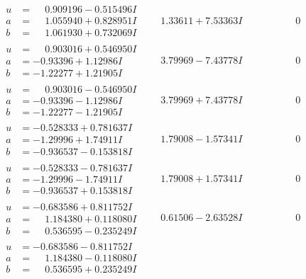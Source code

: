 \documentclass[1p]{elsarticle_modified}
\theoremstyle{definition}
\begin{document}
$$\begin{array}{c|c|c}
\begin{aligned}
u &= \phantom{-}0.909196 - 0.515496 I \\
a &= \phantom{-}1.055940 + 0.828951 I \\
b &= \phantom{-}1.061930 + 0.732069 I\end{aligned}
 & \phantom{-}1.33611 + 7.53363 I & \phantom{-0.000000 } 0 \\ \hline\begin{aligned}
u &= \phantom{-}0.903016 + 0.546950 I \\
a &= -0.93396 + 1.12986 I \\
b &= -1.22277 + 1.21905 I\end{aligned}
 & \phantom{-}3.79969 - 7.43778 I & \phantom{-0.000000 } 0 \\ \hline\begin{aligned}
u &= \phantom{-}0.903016 - 0.546950 I \\
a &= -0.93396 - 1.12986 I \\
b &= -1.22277 - 1.21905 I\end{aligned}
 & \phantom{-}3.79969 + 7.43778 I & \phantom{-0.000000 } 0 \\ \hline\begin{aligned}
u &= -0.528333 + 0.781637 I \\
a &= -1.29996 + 1.74911 I \\
b &= -0.936537 - 0.153818 I\end{aligned}
 & \phantom{-}1.79008 - 1.57341 I & \phantom{-0.000000 } 0 \\ \hline\begin{aligned}
u &= -0.528333 - 0.781637 I \\
a &= -1.29996 - 1.74911 I \\
b &= -0.936537 + 0.153818 I\end{aligned}
 & \phantom{-}1.79008 + 1.57341 I & \phantom{-0.000000 } 0 \\ \hline\begin{aligned}
u &= -0.683586 + 0.811752 I \\
a &= \phantom{-}1.184380 + 0.118080 I \\
b &= \phantom{-}0.536595 - 0.235249 I\end{aligned}
 & \phantom{-}0.61506 - 2.63528 I & \phantom{-0.000000 } 0 \\ \hline\begin{aligned}
u &= -0.683586 - 0.811752 I \\
a &= \phantom{-}1.184380 - 0.118080 I \\
b &= \phantom{-}0.536595 + 0.235249 I\end{aligned}

\end{array}$$
\end{document}
